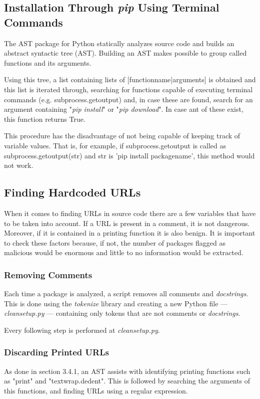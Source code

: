 \subsection{Installation Through \textit{pip} Using Terminal Commands}
The AST package for Python statically analyzes source code and builds an abstract syntactic tree (AST). Building an AST makes possible to group called functions and its arguments.

Using this tree, a list containing lists of [functionname|arguments] is obtained and this list is iterated through, searching for functions capable of executing terminal commands (e.g. subprocess.getoutput) and, in case these are found, search for an argument containing "\textit{pip install}" or "\textit{pip download}". In case ant of these exist, this function returns True.

This procedure has the disadvantage of not being capable of keeping track of variable values. That is, for example, if subprocess.getoutput is called as subprocess.getoutput(str) and str is 'pip install packagename', this method would not work.

\subsection{Finding Hardcoded URLs}
When it comes to finding URLs in source code there are a few variables that have to be taken into account. If a URL is present in a comment, it is not dangerous. Moreover, if it is contained in a printing function it is also benign. It is important to check these factors because, if not, the number of packages flagged as malicious would be enormous and little to no information would be extracted.

\subsubsection{Removing Comments}
Each time a package is analyzed, a script removes all comments and \textit{docstrings}. This is done using the \textit{tokenize} library and creating a new Python file — \textit{cleansetup.py} — containing only tokens that are not comments or \textit{docstrings}.

Every following step is performed at \textit{cleansetup.py}.

\subsubsection{Discarding Printed URLs}
As done in section 3.4.1, an AST assists with identifying printing functions such as "print" and "textwrap.dedent". This is followed by searching the arguments of this functions, and finding URLs using a regular expression.

